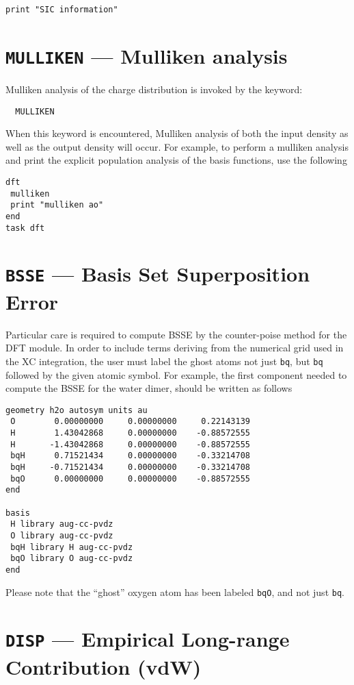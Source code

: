 \begin{verbatim}
print "SIC information"
\end{verbatim}


\section{{\tt MULLIKEN} --- Mulliken analysis}
Mulliken analysis of the charge distribution is invoked by the keyword:
\begin{verbatim}
  MULLIKEN
\end{verbatim}
When this keyword is encountered, Mulliken analysis of both the input 
density as well as the output density will occur.
For example, to perform a mulliken analysis and print the
explicit population analysis of the basis functions, use
the following
\begin{verbatim}
dft
 mulliken
 print "mulliken ao"
end
task dft
\end{verbatim}


\section{{\tt BSSE} --- Basis Set Superposition Error}

Particular care is required to compute BSSE by the counter-poise
method for the DFT module. In order to include terms deriving from
the numerical grid used in the XC integration, the user must label
the ghost atoms not just {\tt bq}, but {\tt bq} followed by the given
atomic symbol. For example, the first component needed to compute the
BSSE for the water dimer, should be written as follows

\begin{verbatim}
geometry h2o autosym units au
 O        0.00000000     0.00000000     0.22143139
 H        1.43042868     0.00000000    -0.88572555
 H       -1.43042868     0.00000000    -0.88572555
 bqH      0.71521434     0.00000000    -0.33214708
 bqH     -0.71521434     0.00000000    -0.33214708
 bqO      0.00000000     0.00000000    -0.88572555
end

basis
 H library aug-cc-pvdz
 O library aug-cc-pvdz
 bqH library H aug-cc-pvdz
 bqO library O aug-cc-pvdz
end
\end{verbatim}

Please note that the ``ghost'' oxygen atom has been labeled {\tt bqO},
and not just {\tt bq}.

\section{{\tt DISP} --- Empirical Long-range Contribution (vdW)}

